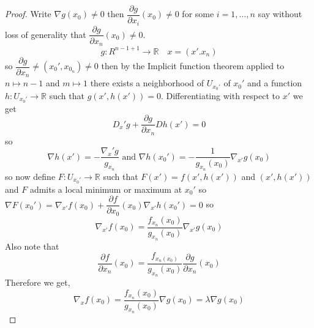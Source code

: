 \documentclass[11pt,openany]{book}
\theoremstyle{plain}
\theoremstyle{definition}
\theoremstyle{remark}
\newcommand{\R}{\mathbb{R}}
\newcommand{\dell}[2]{\dfrac{\partial #1}{\partial #2}}
\begin{document}
\begin{proof}
    Write $\nabla g(x_0) \ne 0$ then $\dell{g}{x_i}(x_0) \ne 0$ for some $i = 1, \dots, n$ say without loss of generality that $\dell{g}{x_n}(x_0) \ne 0$.\[g: R^{n-1+1} \to \R \quad x = (x'.x_n)\] so $\dell{g}{x_n}\ne (x_0',x_{0_n}) \ne 0$ then by the Implicit function theorem applied to $n \mapsto n-1$ and $m \mapsto 1$ there exists a neighborhood of $U_{x_0'}$ of $x_0'$ and a function $h: U_{x_0'} \to \R$ such that $g(x',h(x')) = 0$. Differentiating with respect to $x'$ we get \[D_x'g+\dell{g}{x_n}Dh(x') = 0\] so \[\nabla h(x') = -\frac{\nabla_x' g}{g_{x_n}} \text{ and } \nabla h(x_0') = -\frac{1}{g_{x_n}(x_0)}\nabla_{x'}g(x_0)\] so now define $F: U_{x_0'} \to \R$ such that $F(x') = f(x',h(x'))$ and $(x',h(x'))$ and $F$ admits a local minimum or maximum at $x_0'$ so $\nabla F(x_0') = \nabla_{x'}f(x_0)+\dell{f}{x_0}(x_0)\nabla_{x'}h(x_0') = 0$ so \[ \nabla_{x'}f(x_0) = \frac{f_{x_n}(x_0)}{g_{x_n}(x_0)}\nabla_{x'}g(x_0)\] Also note that \[ \dell{f}{x_n}(x_0) = \frac{f_{x_n(x_0)}}{g_{x_n}(x_0)}  \dell{g}{x_n}(x_0)\] Therefore we get, \[\nabla_xf(x_0) = \frac{f_{x_n}(x_0)}{g_{x_n}(x_0)}\nabla g(x_0) = \lambda \nabla g(x_0)\]
\end{proof}
\end{document}
